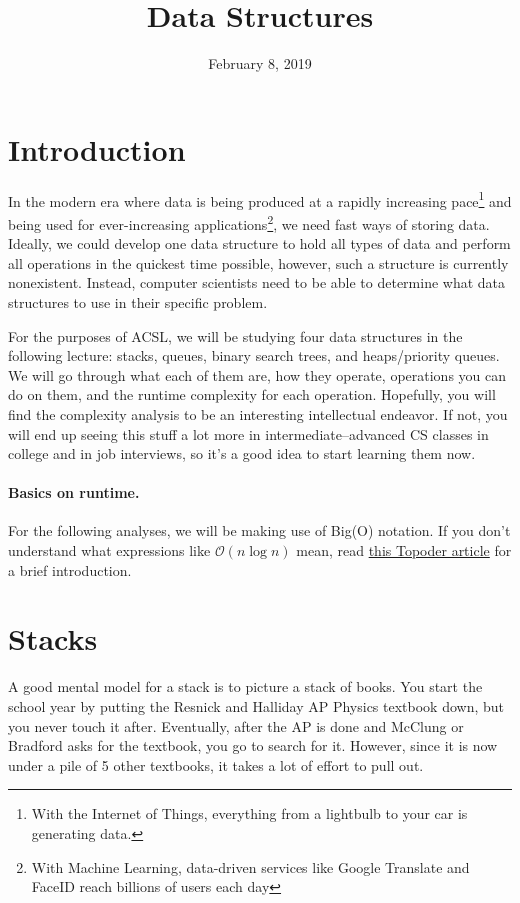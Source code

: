 \documentclass{pset_template}
\title{Data Structures}
\date{February 8, 2019}
\begin{document}
\maketitle

\section{Introduction}
In the modern era where data is being produced at a rapidly increasing
pace\footnote{With the Internet of Things, everything from a lightbulb
to your car is generating data.}
and being used for ever-increasing
applications\footnote{With Machine Learning, data-driven services like Google Translate and
FaceID reach billions of users each day},
we need fast ways of storing data.
Ideally, we could develop one data structure to hold all types of data
and perform all operations in the quickest time possible, however,
such a structure is currently nonexistent.
Instead, computer scientists need to be able to determine what
data structures to use in their specific problem.

For the purposes of ACSL, we will be studying four data structures
in the following lecture: stacks, queues, binary search trees, and
heaps/priority queues.
We will go through what each of them are, how they operate,
operations you can do on them, and the runtime complexity for each operation.
Hopefully, you will find the complexity analysis to be an interesting intellectual endeavor.
If not, you will end up seeing this stuff a lot more in intermediate--advanced CS
classes in college and in job interviews, so it's a good idea to start learning them now.

\paragraph{Basics on runtime.}
For the following analyses, we will be making use of Big(O) notation.
If you don't understand what expressions like $\mathcal{O}(n\log{}n)$ mean,
read \href{https://www.topcoder.com/blog/learning-understanding-big-o-notation/}{this Topoder article}
for a brief introduction.

\section{Stacks}
A good mental model for a stack is to picture a stack of books.
You start the school year by putting the Resnick and Halliday AP Physics
textbook down, but you never touch it after.
Eventually, after the AP is done and McClung or Bradford asks for the textbook,
you go to search for it.
However, since it is now under a pile of 5 other textbooks, it takes a lot of effort to pull out.
\end{document}
